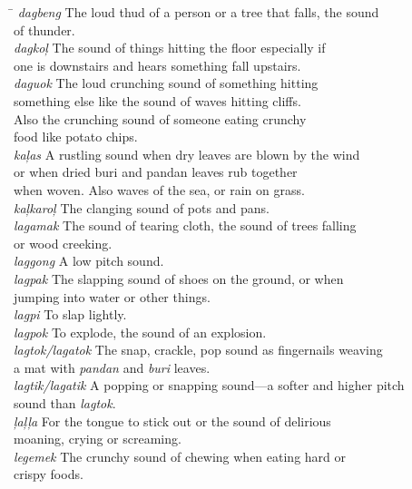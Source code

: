 \ea
\begin{tabbing}
\hspace{2.4cm} \= \kill
\textit{dagbeng}  \>   The loud thud of a person or a tree that falls, the sound \\
\> of thunder. \\
\textit{dagkoļ} \>  The sound of things hitting the floor especially if \\
\> one is downstairs and hears something fall upstairs. \\
\textit{daguok}  \>  The loud crunching sound of something hitting \\
\> something else like the sound of waves hitting cliffs. \\ \> Also the crunching sound of someone eating crunchy \\ \> food like potato chips. \\
\textit{kaļas}  \>      A rustling sound when dry leaves are blown by the  wind \\
\> or when dried buri and pandan leaves rub together \\
\> when woven. Also waves of the sea, or rain on grass. \\
\textit{kaļkaroļ} \>    The clanging sound of pots and pans. \\
\textit{lagamak}  \>   The sound of tearing cloth, the sound of trees falling \\
\> or wood creeking. \\
\textit{laggong}   \>  A low pitch sound. \\
\textit{lagpak}   \>  The slapping sound of shoes on the ground, or when \\
\>jumping into water or other things. \\
\textit{lagpi}    \>   To slap lightly. \\
\textit{lagpok}   \>  To explode, the sound of an explosion. \\
\textit{lagtok/lagatok} \>  The snap, crackle, pop sound as fingernails weaving \\
\> a mat with \textit{pandan} and \textit{buri} leaves. \\
\textit{lagtik/lagatik}   \>  A popping or snapping sound—a softer and higher pitch \\
\> sound than \textit{lagtok}. \\
\textit{ļaļļa}  \>     For the tongue to stick out or the sound of delirious \\
\> moaning, crying or screaming. \\
\textit{legemek}   \>  The crunchy sound of chewing when eating hard or \\ \> crispy foods. \\

\end{tabbing}
